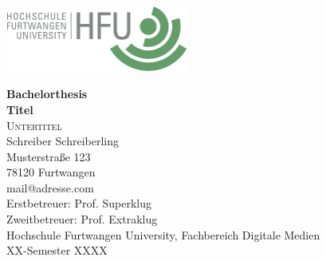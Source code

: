 \thispagestyle{empty}
\begin{titlepage}

\begin{flushright}
	\includegraphics[width=0.45\textwidth]{./Images/hfulogo.pdf}\\
\end{flushright}

\begin{flushleft} 
{\small \textsf{\textbf{Bachelorthesis}}} \\[0.5cm]
{\Huge \textsf{\textbf{Titel}}} \\[0.0cm]
{\Large \textsc{Untertitel}} \\[1cm]
 
Schreiber Schreiberling\\
Musterstraße 123\\
78120 Furtwangen\\
mail@adresse.com\\[1cm]

\color{gray}Erstbetreuer: Prof. Superklug\\
\color{gray}Zweitbetreuer: Prof. Extraklug\\
\color{gray}Hochschule Furtwangen University, Fachbereich Digitale Medien\\[1cm]
\color{black}XX-Semester XXXX

\vfill 
\end{flushleft}
 
\end{titlepage}